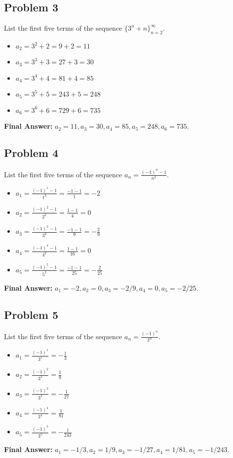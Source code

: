 \documentclass{article}
\begin{document}
\subsection{Problem 3}
List the first five terms of the sequence $\{3^n + n\}_{n=2}^{\infty}$.
\begin{itemize}
    \item $a_2 = 3^2 + 2 = 9 + 2 = 11$
    \item $a_3 = 3^3 + 3 = 27 + 3 = 30$
    \item $a_4 = 3^4 + 4 = 81 + 4 = 85$
    \item $a_5 = 3^5 + 5 = 243 + 5 = 248$
    \item $a_6 = 3^6 + 6 = 729 + 6 = 735$
\end{itemize}
\textbf{Final Answer:} $a_2 = 11, a_3 = 30, a_4 = 85, a_5 = 248, a_6 = 735$.

\subsection{Problem 4}
List the first five terms of the sequence $a_n = \frac{(-1)^n - 1}{n^2}$.
\begin{itemize}
    \item $a_1 = \frac{(-1)^1 - 1}{1^2} = \frac{-1 - 1}{1} = -2$
    \item $a_2 = \frac{(-1)^2 - 1}{2^2} = \frac{1 - 1}{4} = 0$
    \item $a_3 = \frac{(-1)^3 - 1}{3^2} = \frac{-1 - 1}{9} = -\frac{2}{9}$
    \item $a_4 = \frac{(-1)^4 - 1}{4^2} = \frac{1 - 1}{16} = 0$
    \item $a_5 = \frac{(-1)^5 - 1}{5^2} = \frac{-1 - 1}{25} = -\frac{2}{25}$
\end{itemize}
\textbf{Final Answer:} $a_1 = -2, a_2 = 0, a_3 = -2/9, a_4 = 0, a_5 = -2/25$.

\subsection{Problem 5}
List the first five terms of the sequence $a_n = \frac{(-1)^n}{3^n}$.
\begin{itemize}
    \item $a_1 = \frac{(-1)^1}{3^1} = -\frac{1}{3}$
    \item $a_2 = \frac{(-1)^2}{3^2} = \frac{1}{9}$
    \item $a_3 = \frac{(-1)^3}{3^3} = -\frac{1}{27}$
    \item $a_4 = \frac{(-1)^4}{3^4} = \frac{1}{81}$
    \item $a_5 = \frac{(-1)^5}{3^5} = -\frac{1}{243}$
\end{itemize}
\textbf{Final Answer:} $a_1 = -1/3, a_2 = 1/9, a_3 = -1/27, a_4 = 1/81, a_5 = -1/243$.
\end{document}
